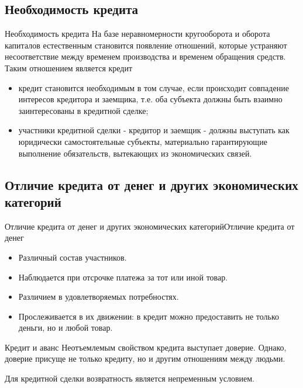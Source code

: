 \documentclass[_DKB_p2_Credit.tex]{subfiles}
\begin{document}

\subsection{Необходимость кредита}
\begin{frame}{Необходимость кредита}
На базе неравномерности кругооборота и оборота капиталов естественным становится появление отношений, которые устраняют несоответствие между временем производства и временем обращения средств. Таким отношением является кредит
\end{frame}

\begin{frame}{}
\begin{itemize}[<+->]
\item
кредит становится необходимым в том случае, если происходит совпадение интересов кредитора и заемщика, т.е. оба субъекта должны быть взаимно заинтересованы в кредитной сделке;
\item
участники кредитной сделки - кредитор и заемщик - должны выступать как юридически самостоятельные субъекты, материально гарантирующие выполнение обязательств, вытекающих из экономических связей.

\end{itemize}
\end{frame}

\subsection{Отличие кредита от денег и других экономических категорий}
\begin{frame}{\setfontsize{12pt}Отличие кредита от денег и других экономических категорий}{Отличие кредита от денег}
\begin{itemize}
\item
Различный состав участников. 
\item
Наблюдается при отсрочке платежа за тот или иной товар. 
\item
Различием в удовлетворяемых потребностях.
\item
Прослеживается в их движении: в кредит можно предоставить не только деньги, но и любой товар.
\end{itemize}
\end{frame}

\begin{frame}{Кредит и аванс}
Неотъемлемым свойством кредита выступает доверие. Однако, доверие присуще не только кредиту, но и другим отношениям между людьми.

Для кредитной сделки возвратность является непременным условием.
\end{frame}
\end{document}

